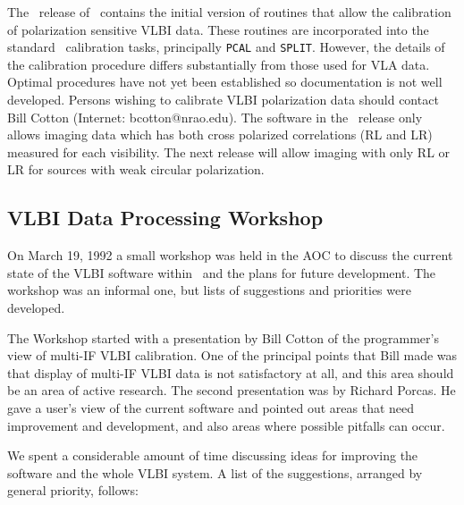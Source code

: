    The \RELEASENAME\ release of \AIPS\ contains the initial version of
routines that allow the calibration of polarization sensitive VLBI
data.  These routines are incorporated into the standard \AIPS\
calibration tasks, principally {\tt PCAL} and \hbox{{\tt SPLIT}}.
However, the details of the calibration procedure differs
substantially from those used for VLA data.  Optimal procedures have
not yet been established so documentation is not well developed.
Persons wishing to calibrate VLBI polarization data should contact
Bill Cotton (Internet: bcotton@nrao.edu). The software in the
\RELEASENAME\ release only allows imaging data which has both cross
polarized correlations (RL and LR) measured for each visibility.  The
next release will allow imaging with only RL or LR for sources with
weak circular polarization.

\subsection{VLBI Data Processing Workshop}

On March 19, 1992 a small workshop was held in the AOC to discuss
the current state of the VLBI software within \AIPS\ and the plans for
future development.  The workshop was an informal one, but lists of
suggestions and priorities were developed.

The Workshop started with a presentation by Bill Cotton of the
programmer's view of multi-IF VLBI calibration.  One of the principal
points that Bill made was that display of multi-IF VLBI data is not
satisfactory at all, and this area should be an area of active
research.  The second presentation was by Richard Porcas.  He gave a
user's view of the  current software and pointed out areas that need
improvement and development, and also areas where possible pitfalls
can occur.

We spent a considerable amount of time discussing ideas for improving
the software and the whole VLBI system.  A list of the suggestions,
arranged by general priority, follows:

